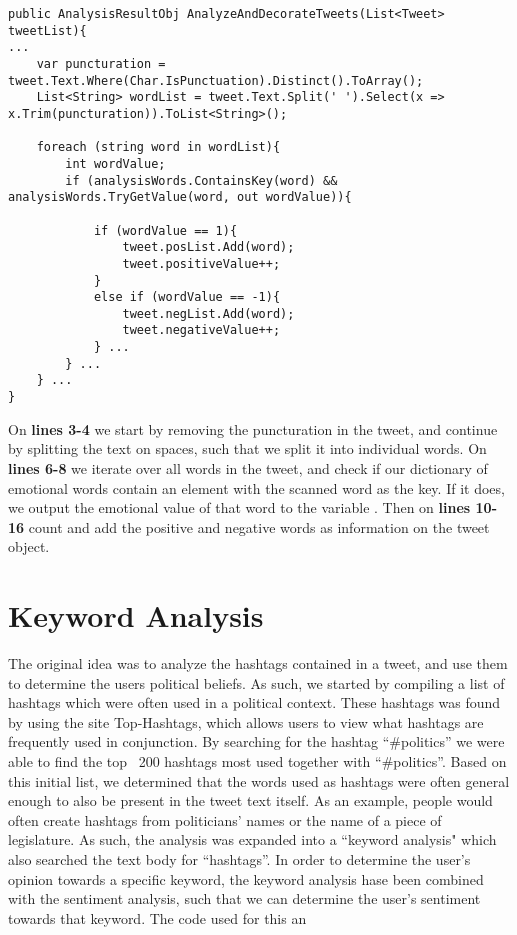 \begin{minipage}[H]{\linewidth}
\begin{lstlisting}[caption = Determining the sentiment of a tweet , label =
sentiAnalCode] 
public AnalysisResultObj AnalyzeAndDecorateTweets(List<Tweet> tweetList){
...
	var puncturation = tweet.Text.Where(Char.IsPunctuation).Distinct().ToArray(); 
    List<String> wordList = tweet.Text.Split(' ').Select(x => x.Trim(puncturation)).ToList<String>();

	foreach (string word in wordList){
		int wordValue;
    	if (analysisWords.ContainsKey(word) && analysisWords.TryGetValue(word, out wordValue)){
           	
            if (wordValue == 1){
               	tweet.posList.Add(word);
                tweet.positiveValue++;
            }
            else if (wordValue == -1){
              	tweet.negList.Add(word);
               	tweet.negativeValue++;
          	} ...
		} ...
	} ...
}
\end{lstlisting}
\end{minipage}

On \textbf{lines 3-4} we start by removing the puncturation in the tweet, and
continue by splitting the text on spaces, such that we split it into individual words. On
\textbf{lines 6-8} we iterate over all words in the tweet, and check if our
dictionary of emotional words contain an element with the scanned word as the key. If it does,
we output the emotional value of that word to the variable .
Then on \textbf{lines 10-16} count and add the positive and negative words as
information on the tweet object.

\section{Keyword Analysis}
The original idea was to analyze the hashtags contained in a tweet, and use them
to determine the users political beliefs. As such, we started by compiling a
list of hashtags which were often used in a political context. These hashtags
was found by using the site Top-Hashtags, which allows users to view what
hashtags are frequently used in conjunction. By searching for the hashtag
``\#politics'' we were able to find the top ~200 hashtags most used together
with ``\#politics''. 
Based on this initial list, we determined that the words used as hashtags were
often general enough to also be present in the tweet text itself. As an example,
people would often create hashtags from politicians' names or the name of a
piece of legislature. 
As such, the analysis was expanded into a ``keyword analysis" which also
searched the text body for ``hashtags''. In order to determine the user's
opinion towards a specific keyword, the keyword analysis hase been combined with
the sentiment analysis, such that we can determine the user's sentiment towards
that keyword. The code used for this an

